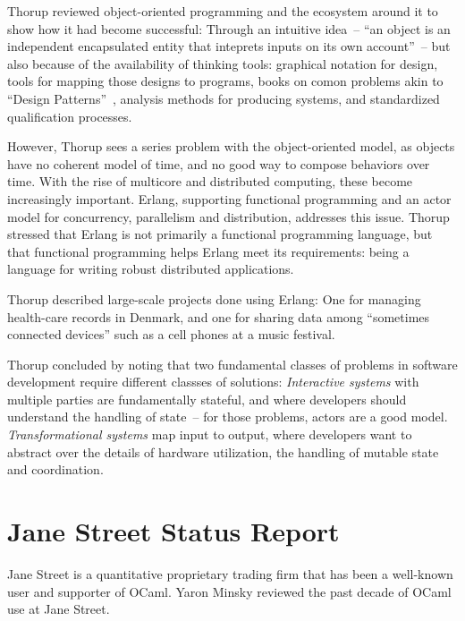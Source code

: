 \documentclass{jfp1}
\begin{document}
Thorup reviewed object-oriented programming and the ecosystem around
it to show how it had become successful: Through an intuitive idea~--
``an object is an independent encapsulated entity that inteprets
inputs on its own account''~-- but also because of the availability of
thinking tools: graphical notation for design, tools for mapping those
designs to programs, books on comon problems akin to ``Design
Patterns''~\cite{GammaHelmJohnsonVlissides1995}, analysis methods for producing systems,
and standardized qualification processes.

However, Thorup sees a series problem with the object-oriented model,
as objects have no coherent model of time, and no good way to compose
behaviors over time.  With the rise of multicore and distributed
computing, these become increasingly important.  Erlang, supporting
functional programming and an actor model for concurrency, parallelism
and distribution, addresses this issue.  Thorup stressed that Erlang
is not primarily a functional programming language, but that
functional programming helps Erlang meet its requirements: being a
language for writing robust distributed applications.

Thorup described large-scale projects done using Erlang: One for
managing health-care records in Denmark, and one for sharing data
among ``sometimes connected devices'' such as a cell phones at a music
festival.

Thorup concluded by noting that two fundamental classes of problems in
software development require different classses of solutions:
\textit{Interactive systems} with multiple parties are fundamentally
stateful, and where developers should understand the handling of
state~-- for those problems, actors are a good model.
\textit{Transformational systems} map input to output, where
developers want to abstract over the details of hardware utilization,
the handling of mutable state and coordination.

\section{Jane Street Status Report}

Jane Street is a quantitative proprietary trading firm that has been a
well-known user and supporter of OCaml.  Yaron Minsky reviewed the
past decade of OCaml use at Jane Street.
\end{document}
